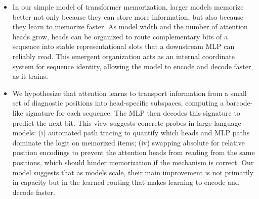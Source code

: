 \documentclass{article}
\theoremstyle{plain}
\theoremstyle{definition}
\theoremstyle{remark}
\begin{document}
\begin{itemize}
    \begin{itemize}
        \item We hypothesize that the model learns to transport information from a small set of diagnostic positions into head-specific subspaces, computing a barcode-like signature for each sequence. The MLP then decodes this signature to predict the next bit.
        \item The attention heads adapt to allow learning to memorize
        \begin{itemize}
            \item Result 3a: Probe sequences show that as training proceeds, the attention heads present more informative input into the MLP
            \item Result 3b: If we set attention weights to zero, model does not memorize
            \item Result 3c: After the swap phase, the model has catastrophically forgotten the sequences it learned pre-switch. 
            However, we can use post-Swap2 attention weights + pre-Swap MLP weights to rescue model performance
        \end{itemize}
    \end{itemize}
    \item In our simple model of transformer memorization, larger models memorize better not only because they can store more information, but also because they learn to memorize faster. As model width and the number of attention heads grow, heads can be organized to route complementary bits of a sequence into stable representational slots that a downstream MLP can reliably read. This emergent organization acts as an internal coordinate system for sequence identity, allowing the model to encode and decode faster as it trains.
\item We hypothesize that attention learns to transport information from a small set of diagnostic positions into head-specific subspaces, computing a barcode-like signature for each sequence. The MLP then decodes this signature to predict the next bit. This view suggests concrete probes in large language models: (i) automated path tracing to quantify which heads and MLP paths dominate the logit on memorized items; (iv) swapping absolute for relative position encodings to prevent the attention heads from reading from the same positions, which should hinder memorization if the mechanism is correct. Our model suggests that as models scale, their main improvement is not primarily in capacity but in the learned routing that makes learning to encode and decode faster.
\end{itemize}
\end{document}
